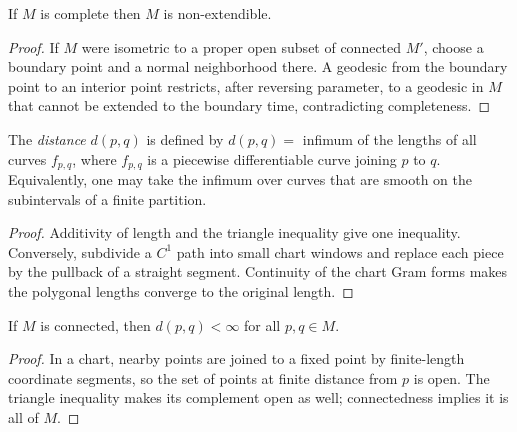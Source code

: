 \begin{proposition}

  \label{prop:dc-ch7-2-3}
  \leanok
If $M$ is complete then $M$ is non-extendible.
\end{proposition}
\begin{proof}

  \leanok
\sketch If $M$ were isometric to a proper open subset of connected $M'$, choose a boundary point and a normal neighborhood there. A geodesic from the boundary point to an interior point restricts, after reversing parameter, to a geodesic in $M$ that cannot be extended to the boundary time, contradicting completeness.
\end{proof}

\begin{definition}[distance]

  \label{def:dc-ch7-2-4}
  \leanok
The \emph{distance} $d(p,q)$ is defined by $d(p,q)=$ infimum of the lengths of all
  curves $f_{p,q}$, where $f_{p,q}$ is a piecewise differentiable curve joining $p$
  to $q$. Equivalently, one may take the infimum over curves that are smooth on
  the subintervals of a finite partition.
\end{definition}
\begin{proof}
\sketch Additivity of length and the triangle inequality give one inequality.
  Conversely, subdivide a $C^1$ path into small chart windows and replace each
  piece by the pullback of a straight segment. Continuity of the chart Gram
  forms makes the polygonal lengths converge to the original length.
\end{proof}

\begin{lemma}

  \label{lem:dc-ch7-2-4-finite}
  \leanok
If $M$ is connected, then $d(p,q)<\infty$ for all $p,q\in M$.
\end{lemma}
\begin{proof}

  \leanok
\sketch In a chart, nearby points are joined to a fixed point by finite-length coordinate segments, so the set of points at finite distance from $p$ is open. The triangle inequality makes its complement open as well; connectedness implies it is all of $M$.
\end{proof}

